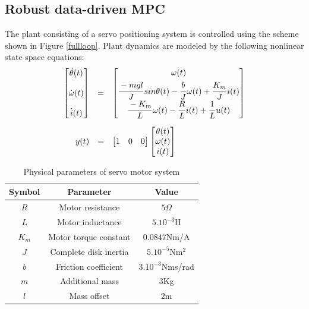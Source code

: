 \documentclass[letterpaper, 10 pt, conference]{ieeeconf}  %
\begin{document}
	\subsection{Robust data-driven MPC }
	The plant consisting of a servo positioning system is controlled using the scheme shown in Figure \ref{fullloop}. Plant dynamics are modeled by the following nonlinear state space equations:
	\begin{equation*}
	\small
	\begin{array}{rcl}
	\begin{bmatrix}
	\dot{\theta}(t) \vspace{12pt} \\
	\dot{\omega}(t) \vspace{12pt} \\
	\dot{i}(t)
	\end{bmatrix} &=& 
	\begin{bmatrix}
	\omega(t) \vspace{3pt}\\
	\cfrac{-mgl}{J}\hspace{1pt}sin\theta(t)-\cfrac{b}{J}\hspace{1pt}\omega(t) + \cfrac{K_m}{J}\hspace{1pt}i(t) \\  
	\cfrac{-K_m}{L}\hspace{1pt}\omega(t)-\cfrac{R}{L}\hspace{1pt}i(t) + \cfrac{1}{L}\hspace{1pt}u(t)
	\end{bmatrix} \vspace{10pt}\\
	y(t) &=& \begin{bmatrix} 1 & 0 & 0 \end{bmatrix} 
	\begin{bmatrix} \theta(t) \\ \omega(t) \\ i(t) \end{bmatrix} 
	\end{array}
	\end{equation*}
	\begin{table}[h!]
		\hspace{20pt}
		\begin{tabular}{||c|c|c||} 
			\hline
			Symbol & Parameter & Value\\ [0.5ex] 
			\hline\hline
			$R$ & Motor resistance & $5\Omega$ \\ 
			$L$ & Motor inductance & $5.10^{-3}$H \\
			$K_m$ & Motor torque constant & $0.0847$Nm/A \\
			$J$ & Complete disk inertia & $5.10^{-5}$Nm$^2$ \\
			$b$ & Friction coefficient & $3.10^{-3}$Nms/rad \\
			$m$ & Additional mass & $3$Kg \\
			$l$ & Mass offset & $2$m \\
			\hline
		\end{tabular}
		\caption{Physical parameters of servo motor system}
		\label{Simparam}
		\vspace{-10pt}  
	\end{table}
\end{document}
